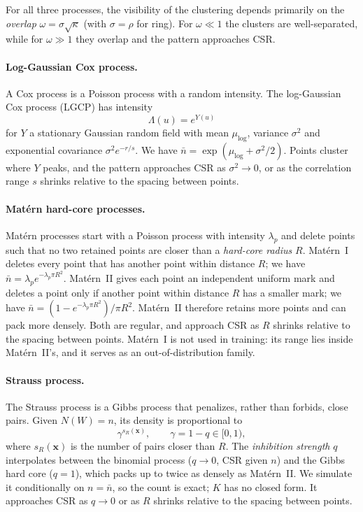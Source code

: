 \documentclass[twoside]{article}
\newcommand{\nb}{\bar n}
\newcommand{\pc}{\mathbf{x}}
\newcommand{\kpar}{\kappa}
\begin{document}
For all three processes, the visibility of the clustering depends primarily on the \emph{overlap}
$\omega=\sigma\sqrt{\kpar}$ (with $\sigma = \rho$ for ring). For $\omega\ll1$ the clusters are well-separated, while for $\omega\gg1$ they overlap and the pattern approaches CSR.

\paragraph{Log-Gaussian Cox process.}
A Cox process is a Poisson process with a random intensity. The log-Gaussian Cox process (LGCP) has intensity
\[
    \Lambda(u)=e^{Y(u)}
\]
for $Y$ a stationary Gaussian random field with mean $\mu_{\log}$, variance $\sigma^2$
and exponential covariance $\sigma^2 e^{-r/s}$. We have $\nb=\exp(\mu_{\log}+\sigma^2/2)$. Points cluster where $Y$ peaks, and the pattern approaches CSR as $\sigma^2\to0$, or as the correlation range $s$ shrinks relative to the spacing between points.

\paragraph{Mat\'ern hard-core processes.}
Mat\'ern processes start with a Poisson process with intensity $\lambda_p$ and delete points such that no two retained points are closer than a \emph{hard-core radius} $R$. Mat\'ern~I deletes every point that has another point within distance $R$; we have $\nb=\lambda_p e^{-\lambda_p\pi R^2}$. Mat\'ern~II gives each point an independent uniform mark and deletes a point only if another point within distance $R$ has a smaller mark; we have $\nb=(1-e^{-\lambda_p\pi R^2})/\pi R^2$. Mat\'ern~II therefore retains more points and can pack more densely. Both are regular, and approach CSR as $R$ shrinks relative to the spacing between points. Mat\'ern~I is not used in training: its range lies inside Mat\'ern~II's, and it serves as an out-of-distribution family.

\paragraph{Strauss process.}
The Strauss process is a Gibbs process that penalizes, rather than forbids, close pairs. Given $N(W)=n$, its density is proportional to
\[
  \gamma^{s_R(\pc)}, \qquad \gamma=1-q\in[0,1),
\]
where $s_R(\pc)$ is the number of pairs closer than $R$. The \emph{inhibition strength} $q$ interpolates between the binomial process ($q\to0$, CSR given $n$) and the Gibbs hard core ($q=1$), which packs up to twice as densely as Mat\'ern~II. We simulate it conditionally on $n=\nb$, so the count is exact; $K$ has no closed form. It approaches CSR as $q\to0$ or as $R$ shrinks relative to the spacing between points.
\end{document}
